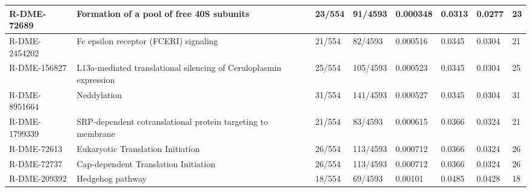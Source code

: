 \documentclass{article}
\begin{document}
{\begin{landscape}
\begin{table}[!ht]
\begin{tabular}{|m{3cm}|m{6cm}|m{1cm}|m{1.5cm}|m{2cm}|m{1cm}|m{1cm}|m{1cm}|}
        R-DME-72689 & Formation of a pool of free 40S subunits & 23/554 & 91/4593 & 0.000348 & 0.0313 & 0.0277 & 23 \\ \hline
        R-DME-2454202 & Fc epsilon receptor (FCERI) signaling & 21/554 & 82/4593 & 0.000516 & 0.0345 & 0.0304 & 21 \\ \hline
        R-DME-156827 & L13a-mediated translational silencing of Ceruloplasmin expression & 25/554 & 105/4593 & 0.000523 & 0.0345 & 0.0304 & 25 \\ \hline
        R-DME-8951664 & Neddylation & 31/554 & 141/4593 & 0.000527 & 0.0345 & 0.0304 & 31 \\ \hline
        R-DME-1799339 & SRP-dependent cotranslational protein targeting to membrane & 21/554 & 83/4593 & 0.000615 & 0.0366 & 0.0324 & 21 \\ \hline
        R-DME-72613 & Eukaryotic Translation Initiation & 26/554 & 113/4593 & 0.000712 & 0.0366 & 0.0324 & 26 \\ \hline
        R-DME-72737 & Cap-dependent Translation Initiation & 26/554 & 113/4593 & 0.000712 & 0.0366 & 0.0324 & 26 \\ \hline
        R-DME-209392 & Hedgehog pathway & 18/554 & 69/4593 & 0.00101 & 0.0485 & 0.0428 & 18 \\ \hline
    \end{tabular}
\end{table}
\end{landscape}

}
\end{document}
